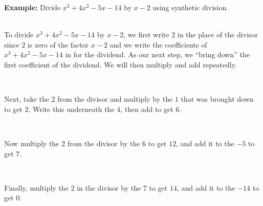 \documentclass[12pt]{article}
\theoremstyle{definition}
\begin{document}
{\bf Example:} Divide $x^3+4x^2-5x-14$ by $x-2$ using synthetic division.\\
\ \par
To divide $x^3+4x^2-5x-14$ by $x-2$, we first write $2$ in the place of the divisor since $2$ is zero of the factor $x-2$ and we write the coefficients of $x^3+4x^2-5x-14$ in for the dividend.  As our next step, we ``bring down'' the first coefficient of the dividend.
We will then multiply and add repeatedly.

\begin{center}
\begin{multicols}{2}
\\
\end{multicols}
\end{center}

Next, take the $2$ from the divisor and multiply by the $1$ that was brought down to get $2$.  Write this underneath the $4$, then add to get $6$.

\begin{center}
\begin{multicols}{2}
\\
\end{multicols}
\end{center}

Now multiply the $2$ from the divisor by the $6$ to get $12$, and add it to the $-5$ to get $7$.

\begin{center}
\begin{multicols}{2}
\\
\end{multicols}
\end{center}

Finally, multiply the $2$ in the divisor by the $7$ to get $14$, and add it to the $-14$ to get $0$.

\begin{center}
\begin{multicols}{2}
\\
\end{multicols}
\end{center}
\end{document}

